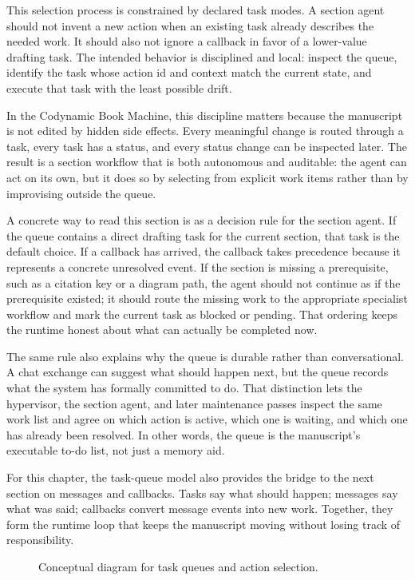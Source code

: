 \documentclass[11pt]{article}
\begin{document}
This selection process is constrained by declared task modes. A section agent should not invent a new action when an existing task already describes the needed work. It should also not ignore a callback in favor of a lower-value drafting task. The intended behavior is disciplined and local: inspect the queue, identify the task whose action id and context match the current state, and execute that task with the least possible drift.

In the Codynamic Book Machine, this discipline matters because the manuscript is not edited by hidden side effects. Every meaningful change is routed through a task, every task has a status, and every status change can be inspected later. The result is a section workflow that is both autonomous and auditable: the agent can act on its own, but it does so by selecting from explicit work items rather than by improvising outside the queue.

A concrete way to read this section is as a decision rule for the section agent. If the queue contains a direct drafting task for the current section, that task is the default choice. If a callback has arrived, the callback takes precedence because it represents a concrete unresolved event. If the section is missing a prerequisite, such as a citation key or a diagram path, the agent should not continue as if the prerequisite existed; it should route the missing work to the appropriate specialist workflow and mark the current task as blocked or pending. That ordering keeps the runtime honest about what can actually be completed now.

The same rule also explains why the queue is durable rather than conversational. A chat exchange can suggest what should happen next, but the queue records what the system has formally committed to do. That distinction lets the hypervisor, the section agent, and later maintenance passes inspect the same work list and agree on which action is active, which one is waiting, and which one has already been resolved. In other words, the queue is the manuscript's executable to-do list, not just a memory aid.

For this chapter, the task-queue model also provides the bridge to the next section on messages and callbacks. Tasks say what should happen; messages say what was said; callbacks convert message events into new work. Together, they form the runtime loop that keeps the manuscript moving without losing track of responsibility.

\begin{figure}[htbp]
\centering

\caption{Conceptual diagram for task queues and action selection.}
\end{figure}
\end{document}
